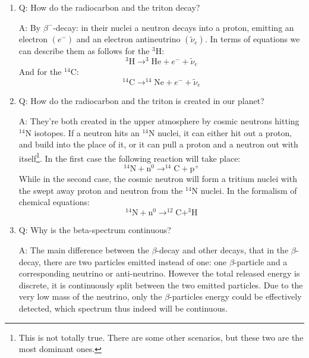 \begin{enumerate}
    \item Q: How do the radiocarbon and the triton decay?
    \begin{displayquote}
        A: By $\beta^{-}$-decay: in their nuclei a neutron decays into a proton, emitting an electron $\left( e^{-} \right)$ and an electron antineutrino $\left( \tilde{\nu}_{e} \right)$. In terms of equations we can describe them  as follows for the $^{3}$H:
        \begin{equation}
        ^{3}\text{H} \to ^{3}\text{He} + e^{-} + \tilde{\nu}_{e}
        \end{equation}
And for the $^{14}$C:
		\begin{equation}
		^{14}\text{C} \to ^{14}\text{Ne} + e^{-} + \tilde{\nu}_{e}
		\end{equation}
    \end{displayquote}
    
    \item Q: How do the radiocarbon and the triton is created in our planet?
    \begin{displayquote}
        A: They're both created in the upper atmosphere by cosmic neutrons hitting $^{14}$N isotopes. If a neutron hits an $^{14}$N nuclei, it can either hit out a proton, and build into the place of it, or it can pull a proton and a neutron out with itself\footnote{This is not totally true. There are some other scenarios, but these two are the most dominant ones.}. In the first case the following reaction will take place:
        \begin{equation}
        ^{14}\text{N} + \text{n}^{0} \to ^{14}\text{C} + \text{p}^{+}
        \end{equation}
While in the second case, the cosmic neutron will form a tritium nuclei with the swept away proton and neutron from the $^{14}$N nuclei. In the formalism of chemical equations:
		\begin{equation}
		^{14}\text{N} + \text{n}^{0} \to ^{12}\text{C} + ^{3}\text{H}
		\end{equation}
    \end{displayquote}
    
    \item Q: Why is the beta-spectrum continuous?
    \begin{displayquote}
        A: The main difference between the $\beta$-decay and other decays, that in the $\beta$-decay, there are two particles emitted instead of one: one $\beta$-particle and a corresponding neutrino or anti-neutrino. However the total released energy is discrete, it is continuously split between the two emitted particles. Due to the very low mass of the neutrino, only the $\beta$-particles energy could be effectively detected, which spectrum thus indeed will be continuous.
    \end{displayquote}
    

\end{enumerate}
